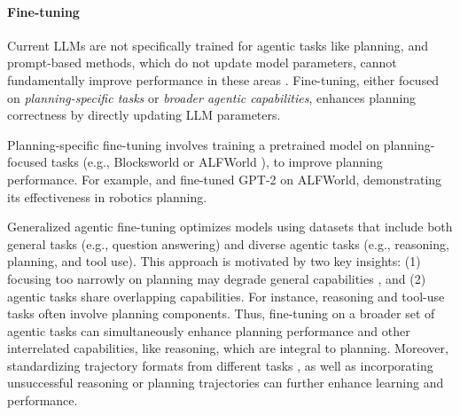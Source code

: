 \vspace{-0.1in}
\paragraph{Fine-tuning} \label{subsec:instruction-tuning}Current LLMs are not specifically trained for agentic tasks like planning, and prompt-based methods, which do not update model parameters, cannot fundamentally improve performance in these areas \cite{chen2023fireact, wang2024learning}. Fine-tuning, either focused on \emph{planning-specific tasks} or \emph{broader agentic capabilities}, enhances planning correctness by directly updating LLM parameters.

Planning-specific fine-tuning involves training a pretrained model on planning-focused tasks (e.g., Blocksworld or ALFWorld \cite{shridhar2020alfworld}), to improve planning performance. For example, \citet{jansen2020visually} and \citet{chalvatzaki2023learning} fine-tuned GPT-2 \cite{radford2019language} on ALFWorld, demonstrating its effectiveness in robotics planning. 

Generalized agentic fine-tuning optimizes models using datasets that include both general tasks (e.g., question answering) and diverse agentic tasks (e.g., reasoning, planning, and tool use). This approach is motivated by two key insights: (1) focusing too narrowly on planning may degrade general capabilities \cite{chen2024agent}, and (2) agentic tasks share overlapping capabilities. For instance, reasoning and tool-use tasks often involve planning components. Thus, fine-tuning on a broader set of agentic tasks can simultaneously enhance planning performance and other interrelated capabilities, like reasoning, which are integral to planning. Moreover, standardizing trajectory formats from different tasks \cite{zhang2024agentohana, chen2024agent}, as well as incorporating unsuccessful reasoning or planning trajectories \cite{wang2024learning, chen2024agent, song2024trial} can further enhance learning and performance.